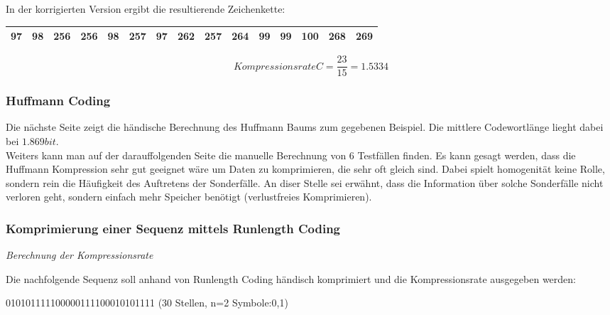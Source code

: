 \documentclass[12pt,german]{article}
\begin{document}
In der korrigierten Version ergibt die resultierende Zeichenkette: 

\begin{table}[H]
  \centering
  \begin{tabular}{| c | c | c | c | c | c | c | c | c | c | c | c | c | c | c |}
    \hline
    97 & 98& 256 & 256 & 98 & 257 & 97 & 262 & 257 & 264 & 99 & 99 & 100 & 268 & 269 \\
    \hline
  \end{tabular}
\end{table}


\begin{equation}[H]
 Kompressionsrate C = \frac{23}{15} = 1.5334	
\end{equation}


\subsubsection{Huffmann Coding}

Die nächste Seite zeigt die händische Berechnung des Huffmann Baums zum gegebenen Beispiel. Die mittlere Codewortlänge lieght dabei bei $1.869 bit $. \\

Weiters kann man auf der darauffolgenden Seite die manuelle Berechnung von 6 Testfällen finden. Es kann gesagt werden, dass die Huffmann Kompression sehr gut geeignet wäre um Daten zu komprimieren, die sehr oft gleich sind. Dabei spielt homogenität keine Rolle, sondern rein die Häufigkeit des Auftretens der Sonderfälle. An diser Stelle sei erwähnt, dass die Information über solche Sonderfälle nicht verloren geht, sondern einfach mehr Speicher benötigt (verlustfreies Komprimieren).


\label{fig:huffmannCalculation}


\label{fig:huffmannCalculation}


\subsubsection{Komprimierung einer Sequenz mittels Runlength Coding}
\textit{Berechnung der Kompressionsrate} 

Die nachfolgende Sequenz soll anhand von Runlength Coding händisch komprimiert und die Kompressionsrate ausgegeben werden:

010101111100000111100010101111 (30 Stellen, n=2 Symbole:0,1) \\
\end{document}
